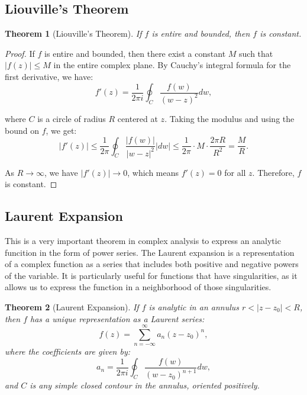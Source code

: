 \documentclass{article}
\newtheorem{theorem}{Theorem}[section]
\begin{document}
\subsection{Liouville's Theorem}
\begin{theorem}[Liouville's Theorem]
    If $f$ is entire and bounded, then $f$ is constant.
\end{theorem}

\begin{proof}
    If $f$ is entire and bounded, then there exist a constant $M$ such that $|f(z)| \leq M$ in the entire complex plane. By Cauchy's integral formula for the first derivative, we have:
    \begin{equation}
        f'(z) = \frac{1}{2\pi i} \oint_C \frac{f(w)}{(w-z)^2} dw,
    \end{equation}
    
    where $C$ is a circle of radius $R$ centered at $z$. Taking the modulus and using the bound on $f$, we get:
    \begin{equation}
        |f'(z)| \leq \frac{1}{2\pi} \oint_C \frac{|f(w)|}{|w-z|^2} |dw| \leq \frac{1}{2\pi} \cdot M \cdot \frac{2\pi R}{R^2} = \frac{M}{R}.
    \end{equation}
    
    As $R \to \infty$, we have $|f'(z)| \to 0$, which means $f'(z) = 0$ for all $z$. Therefore, $f$ is constant.
\end{proof}

\subsection{Laurent Expansion}

This is a very important theorem in complex analysis to express an analytic funcition in the form of power series. The Laurent expansion is a representation of a complex function as a series that includes both positive and negative powers of the variable. It is particularly useful for functions that have singularities, as it allows us to express the function in a neighborhood of those singularities. 
\begin{theorem}[Laurent Expansion]
    If $f$ is analytic in an annulus $r < |z - z_0| < R$, then $f$ has a unique representation as a Laurent series:
    \begin{equation}
        f(z) = \sum_{n=-\infty}^{\infty} a_n (z - z_0)^n,
    \end{equation}
    where the coefficients are given by:
    \begin{equation}
        a_n = \frac{1}{2\pi i} \oint_C \frac{f(w)}{(w - z_0)^{n+1}} dw,
    \end{equation}
    and $C$ is any simple closed contour in the annulus, oriented positively.
\end{theorem}
\end{document}
